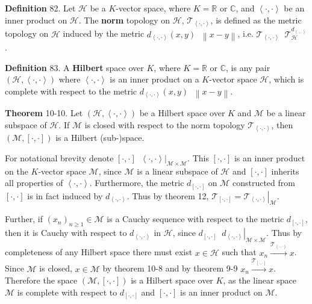 \documentclass[a4paper]{article}
\newcommand{\clo}[1]{\left [ #1 \right ]}
\newcommand{\brac}[1]{\left ( #1 \right )}
\newcommand{\induc}[1]{\left . #1 \right \vert}
\newcommand{\nrm}[1]{\left\| #1 \right \|}
\newcommand{\brkt}[1]{\left\langle #1 \right\rangle}
\newcommand{\Real}{\mathbb{R}}
\newcommand{\Cplx}{\mathbb{C}}
\newcommand{\Tcal}{\mathcal{T}}
\newcommand{\Hcal}{\mathcal{H}}
\newcommand{\Mcal}{\mathcal{M}}
\newcommand{\defn}{\mathop{\overset{\Delta}{=}}\nolimits}
\begin{document}
\noindent \textbf{Definition} 82.
Let $\Hcal$ be a $K$-vector space, where $K=\Real$ or $\Cplx$, and $\brkt{\cdot,\cdot}$ be an inner product on $\Hcal$. The \textbf{norm} topology on $\Hcal$, $\Tcal_{\brkt{\cdot,\cdot}}$, is defined as the metric topology on $\Hcal$ induced by the metric $d_{\brkt{\cdot,\cdot}}\brac{x,y}\defn\nrm{x-y}$, i.e. $\Tcal_{\brkt{\cdot,\cdot}} \defn \Tcal_\Hcal^{d_{\brkt{\cdot,\cdot}}}$.

\noindent \textbf{Definition} 83.
A \textbf{Hilbert} space over $K$, where $K=\Real$ or $\Cplx$, is any pair $\brac{\Hcal, \brkt{\cdot,\cdot}}$ where $\brkt{\cdot,\cdot}$ is an inner product on a $K$-vector space $\Hcal$, which is complete with respect to the metric $d_{\brkt{\cdot,\cdot}}\brac{x,y}\defn\nrm{x-y}$.

\label{thm:Hilbert_subspace} \noindent \textbf{Theorem} 10-10.
Let $\brac{\Hcal, \brkt{\cdot,\cdot}}$ be a Hilbert space over $K$ and $\Mcal$ be a linear subspace of $\Hcal$. If $\Mcal$ is closed with respect to the norm topology $\Tcal_{\brkt{\cdot,\cdot}}$, then $\brac{\Mcal, \clo{\cdot,\cdot}}$ is a Hilbert (sub-)space.

For notational brevity denote $\clo{\cdot,\cdot}\defn \induc{\brkt{\cdot,\cdot}}_{\Mcal\times \Mcal}$. This $\clo{\cdot,\cdot}$ is an inner product on the $K$-vector space $\Mcal$, since $\Mcal$ is a linear subspace of $\Hcal$ and $\clo{\cdot,\cdot}$ inherits all properties of $\brkt{\cdot,\cdot}$. Furthermore, the metric $d_{\clo{\cdot,\cdot}}$ on $\Mcal$ constructed from $\clo{\cdot,\cdot}$ is in fact induced by $d_{\brkt{\cdot,\cdot}}$. Thus by theorem 12, $\Tcal_{\clo{\cdot,\cdot}} = \induc{\Tcal_{\brkt{\cdot,\cdot}}}_{\Mcal}$.

Further, if $\brac{x_n}_{n\geq 1}\in \Mcal$ is a Cauchy sequence with respect to the metric $d_{\clo{\cdot, \cdot}}$, then it is Cauchy with respect to $d_{\brkt{\cdot, \cdot}}$ in $\Hcal$, since $d_{\clo{\cdot,\cdot}}\defn \induc{d_{\brkt{\cdot, \cdot}}}_{\Mcal\times \Mcal}$. Thus by completeness of any Hilbert space there must exist $x\in \Hcal$ such that $x_n\overset{\Tcal_{\brkt{\cdot,\cdot}}}{\to}x$. Since $\Mcal$ is closed, $x\in \Mcal$ by theorem 10-8 and by theorem 9-9 $x_n\overset{\Tcal_{\clo{\cdot,\cdot}}}{\to}x$. Therefore the space $\brac{\Mcal, \clo{\cdot,\cdot}}$ is a Hilbert space over $K$, as the linear space $\Mcal$ is complete with respect to $d_{\clo{\cdot, \cdot}}$ and $\clo{\cdot, \cdot}$ is an inner product on $\Mcal$.\\
\end{document}
